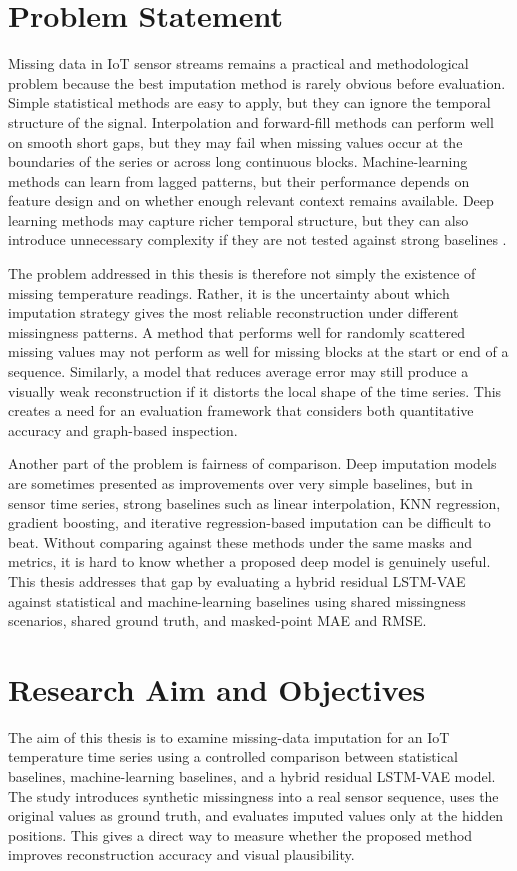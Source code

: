 \section{Problem Statement}
Missing data in IoT sensor streams remains a practical and methodological problem because the best imputation method is rarely obvious before evaluation. Simple statistical methods are easy to apply, but they can ignore the temporal structure of the signal. Interpolation and forward-fill methods can perform well on smooth short gaps, but they may fail when missing values occur at the boundaries of the series or across long continuous blocks. Machine-learning methods can learn from lagged patterns, but their performance depends on feature design and on whether enough relevant context remains available. Deep learning methods may capture richer temporal structure, but they can also introduce unnecessary complexity if they are not tested against strong baselines \cite{Adhikari2022ACS,Erhan2021CriticalCO,Toye2025BenchmarkingMD}.

The problem addressed in this thesis is therefore not simply the existence of missing temperature readings. Rather, it is the uncertainty about which imputation strategy gives the most reliable reconstruction under different missingness patterns. A method that performs well for randomly scattered missing values may not perform as well for missing blocks at the start or end of a sequence. Similarly, a model that reduces average error may still produce a visually weak reconstruction if it distorts the local shape of the time series. This creates a need for an evaluation framework that considers both quantitative accuracy and graph-based inspection.

Another part of the problem is fairness of comparison. Deep imputation models are sometimes presented as improvements over very simple baselines, but in sensor time series, strong baselines such as linear interpolation, KNN regression, gradient boosting, and iterative regression-based imputation can be difficult to beat. Without comparing against these methods under the same masks and metrics, it is hard to know whether a proposed deep model is genuinely useful. This thesis addresses that gap by evaluating a hybrid residual LSTM-VAE against statistical and machine-learning baselines using shared missingness scenarios, shared ground truth, and masked-point MAE and RMSE.

\section{Research Aim and Objectives}
The aim of this thesis is to examine missing-data imputation for an IoT temperature time series using a controlled comparison between statistical baselines, machine-learning baselines, and a hybrid residual LSTM-VAE model. The study introduces synthetic missingness into a real sensor sequence, uses the original values as ground truth, and evaluates imputed values only at the hidden positions. This gives a direct way to measure whether the proposed method improves reconstruction accuracy and visual plausibility.

